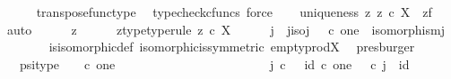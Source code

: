 \begin{isabellebody}
\ \ \ \ \isamarkupfalse%
\ transpose{\isacharunderscore}{\kern0pt}func{\isacharunderscore}{\kern0pt}type\ \isamarkupfalse%
\ {\isacharparenleft}{\kern0pt}typecheck{\isacharunderscore}{\kern0pt}cfuncs{\isacharcomma}{\kern0pt}\ force{\isacharparenright}{\kern0pt}\isanewline
\ \ \isamarkupfalse%
\ uniqueness{\isacharcolon}{\kern0pt}\ {\isachardoublequoteopen}{\isasymforall}z{\isachardot}{\kern0pt}\ z\ {\isasymin}\isactrlsub c\ X\isactrlbsup {\isasymemptyset}\isactrlesup \ {\isasymlongrightarrow}\ z{\isacharequal}{\kern0pt}f\isactrlsup {\isasymsharp}{\isachardoublequoteclose}\isanewline
\ \ \isamarkupfalse%
\ auto\isanewline
\ \ \ \ \isamarkupfalse%
\ z\isanewline
\ \ \ \ \isamarkupfalse%
\ z{\isacharunderscore}{\kern0pt}type{\isacharbrackleft}{\kern0pt}type{\isacharunderscore}{\kern0pt}rule{\isacharbrackright}{\kern0pt}{\isacharcolon}{\kern0pt}\ {\isachardoublequoteopen}z\ {\isasymin}\isactrlsub c\ X\isactrlbsup {\isasymemptyset}\isactrlesup {\isachardoublequoteclose}\isanewline
\ \ \ \ \isamarkupfalse%
\ j\ \ j{\isacharunderscore}{\kern0pt}iso{\isacharcolon}{\kern0pt}{\isachardoublequoteopen}j{\isacharcolon}{\kern0pt}{\isasymemptyset}\ {\isasymrightarrow}\ {\isasymemptyset}\ {\isasymtimes}\isactrlsub c\ one\ {\isasymand}\ isomorphism{\isacharparenleft}{\kern0pt}j{\isacharparenright}{\kern0pt}{\isachardoublequoteclose}\isanewline
\ \ \ \ \ \ \isamarkupfalse%
\ is{\isacharunderscore}{\kern0pt}isomorphic{\isacharunderscore}{\kern0pt}def\ isomorphic{\isacharunderscore}{\kern0pt}is{\isacharunderscore}{\kern0pt}symmetric\ empty{\isacharunderscore}{\kern0pt}prod{\isacharunderscore}{\kern0pt}X\ \isamarkupfalse%
\ presburger\isanewline
\ \ \ \ \isamarkupfalse%
\ {\isasympsi}\ \ psi{\isacharunderscore}{\kern0pt}type{\isacharcolon}{\kern0pt}\ {\isachardoublequoteopen}{\isasympsi}\ {\isacharcolon}{\kern0pt}\ {\isasymemptyset}\ {\isasymtimes}\isactrlsub c\ one\ {\isasymrightarrow}\ {\isasymemptyset}\ {\isasymand}\isanewline
\ \ \ \ \ \ \ \ \ \ \ \ \ \ \ \ \ \ \ \ \ j\ {\isasymcirc}\isactrlsub c\ {\isasympsi}\ {\isacharequal}{\kern0pt}\ id{\isacharparenleft}{\kern0pt}{\isasymemptyset}\ {\isasymtimes}\isactrlsub c\ one{\isacharparenright}{\kern0pt}\ {\isasymand}\ {\isasympsi}\ {\isasymcirc}\isactrlsub c\ j\ {\isacharequal}{\kern0pt}\ id{\isacharparenleft}{\kern0pt}{\isasymemptyset}{\isacharparenright}{\kern0pt}{\isachardoublequoteclose}\isanewline
\ \ \ \ \ \ \isamarkupfalse%

\end{isabellebody}
